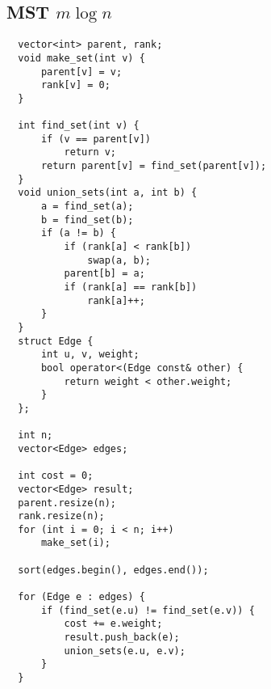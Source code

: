 \subsection{MST $m\log n$}
\begin{lstlisting}
  vector<int> parent, rank;
  void make_set(int v) {
      parent[v] = v;
      rank[v] = 0;
  }

  int find_set(int v) {
      if (v == parent[v])
          return v;
      return parent[v] = find_set(parent[v]);
  }
  void union_sets(int a, int b) {
      a = find_set(a);
      b = find_set(b);
      if (a != b) {
          if (rank[a] < rank[b])
              swap(a, b);
          parent[b] = a;
          if (rank[a] == rank[b])
              rank[a]++;
      }
  }
  struct Edge {
      int u, v, weight;
      bool operator<(Edge const& other) {
          return weight < other.weight;
      }
  };

  int n;
  vector<Edge> edges;

  int cost = 0;
  vector<Edge> result;
  parent.resize(n);
  rank.resize(n);
  for (int i = 0; i < n; i++)
      make_set(i);

  sort(edges.begin(), edges.end());

  for (Edge e : edges) {
      if (find_set(e.u) != find_set(e.v)) {
          cost += e.weight;
          result.push_back(e);
          union_sets(e.u, e.v);
      }
  }
\end{lstlisting}

